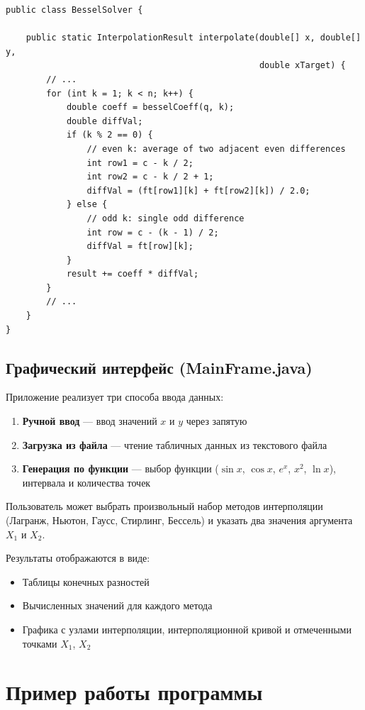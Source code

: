 \begin{lstlisting}[style=javaStyle, label=code:bessel]
public class BesselSolver {

    public static InterpolationResult interpolate(double[] x, double[] y,
                                                  double xTarget) {
        // ...
        for (int k = 1; k < n; k++) {
            double coeff = besselCoeff(q, k);
            double diffVal;
            if (k % 2 == 0) {
                // even k: average of two adjacent even differences
                int row1 = c - k / 2;
                int row2 = c - k / 2 + 1;
                diffVal = (ft[row1][k] + ft[row2][k]) / 2.0;
            } else {
                // odd k: single odd difference
                int row = c - (k - 1) / 2;
                diffVal = ft[row][k];
            }
            result += coeff * diffVal;
        }
        // ...
    }
}
\end{lstlisting}

\subsection{Графический интерфейс (MainFrame.java)}

Приложение реализует три способа ввода данных:
\begin{enumerate}
\item \textbf{Ручной ввод} — ввод значений $x$ и $y$ через запятую
\item \textbf{Загрузка из файла} — чтение табличных данных из текстового файла
\item \textbf{Генерация по функции} — выбор функции ($\sin x$, $\cos x$, $e^x$, $x^2$, $\ln x$), интервала и количества точек
\end{enumerate}

Пользователь может выбрать произвольный набор методов интерполяции (Лагранж, Ньютон, Гаусс, Стирлинг, Бессель) и указать два значения аргумента $X_1$ и $X_2$.

Результаты отображаются в виде:
\begin{itemize}
\item Таблицы конечных разностей
\item Вычисленных значений для каждого метода
\item Графика с узлами интерполяции, интерполяционной кривой и отмеченными точками $X_1$, $X_2$
\end{itemize}

\section{Пример работы программы}

